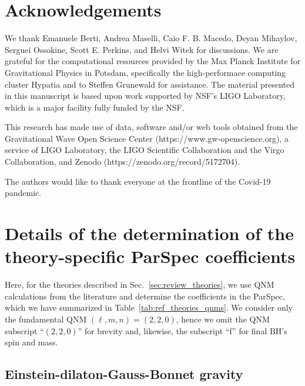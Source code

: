 \documentclass[twocolumn,
               prd,
               aps,
               superscriptaddress,
               tightenlines,
               nofootinbib,
               eqsecnum,
               amsfonts,
               amsmath,
               longbibliography]{revtex4-1}
\begin{document}

\section*{Acknowledgements}
\label{sec:acknowledgements}
%
We thank Emanuele Berti, Andrea Maselli, Caio F. B. Macedo, Deyan Mihaylov,
Serguei Ossokine, Scott E. Perkins, and Helvi Witek for discussions.
%
We are grateful for the computational resources provided by the Max Planck
Institute for Gravitational Physics in Potsdam, specifically the
high-performace computing cluster Hypatia and to Steffen Grunewald for
assistance.
%
The material presented in this manuscript is based upon work supported by NSF’s LIGO Laboratory,
which is a major facility fully funded by the NSF.
%

This research has made use of data, software and/or web tools obtained from the Gravitational Wave Open
Science Center (https://www.gw-openscience.org), a service of LIGO Laboratory, the LIGO Scientific Collaboration
and the Virgo Collaboration, and Zenodo (https://zenodo.org/record/5172704).
%

The authors would like to thank everyone at the frontline of the Covid-19
pandemic.

\appendix

\section{Details of the determination of the theory-specific ParSpec coefficients}
\label{app:map_details}

Here, for the theories described in Sec.~\ref{sec:review_theories}, we
use QNM calculations from the literature and determine
the coefficients in the ParSpec, which we have summarized
in Table~\ref{tab:ref_theories_qnms}.
%
We consider only the fundamental QNM $(\ell, m, n) = (2, 2, 0)$,
hence we omit the QNM subscript ``$(2,2,0)$'' for brevity and, likewise,
the subscript ``f'' for final BH's spin and mass.

\subsection{Einstein-dilaton-Gauss-Bonnet gravity}
\label{app:map_edgb}
\end{document}

